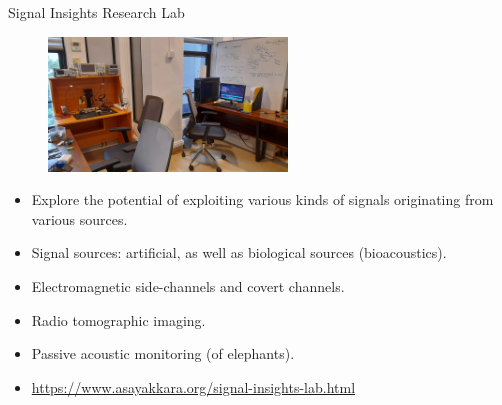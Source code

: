 \documentclass[handout]{beamer}
\begin{document}
\begin{frame}{Signal Insights Research Lab}  

	\begin{figure}
		\includegraphics[width=180pt]{figures/signal-insights-lab-view.jpg}
	\end{figure}
	
	\begin{itemize}
		\footnotesize
		\item Explore the potential of exploiting various kinds of signals originating from various sources.  
		\item Signal sources: artificial, as well as biological sources (bioacoustics).
		\item Electromagnetic side-channels and covert channels.
		\item Radio tomographic imaging.
		\item Passive acoustic monitoring (of elephants).
		\item {\scriptsize \url{https://www.asayakkara.org/signal-insights-lab.html}}
	\end{itemize}

\end{frame}
\end{document}
